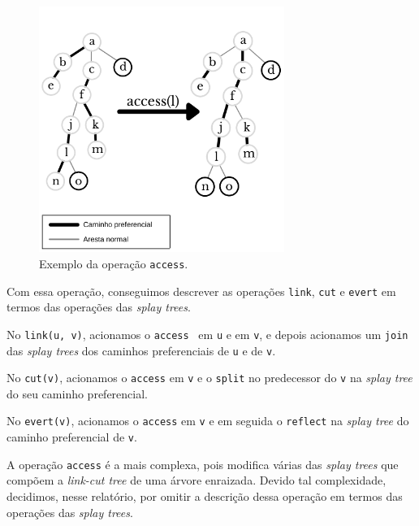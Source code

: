\begin{figure}[htb]
    \centering
    \includegraphics[width=8cm]{figura2.png}
    \caption{Exemplo da operação \texttt{access}.}
    \label{fig:access}
\end{figure}


Com essa operação, conseguimos descrever as operações \texttt{link}, \texttt{cut} e \texttt{evert} em termos das operações das \emph{splay trees}.  

No \texttt{link(u, v)}, acionamos o \texttt{access}~\cite{wiki:LinkCutTree} em \texttt{u} e em \texttt{v}, e depois acionamos um \texttt{join} das \emph{splay trees} dos caminhos preferenciais de \texttt{u} e de \texttt{v}.  

No \texttt{cut(v)}, acionamos o \texttt{access} em \texttt{v} e o \texttt{split} no predecessor do \texttt{v} na \emph{splay tree} do seu caminho preferencial.  

No \texttt{evert(v)}, acionamos o \texttt{access} em \texttt{v} e em seguida o \texttt{reflect} na \emph{splay tree} do caminho preferencial de \texttt{v}.  

A operação \texttt{access} é a mais complexa, pois modifica várias das \emph{splay trees} que compõem a \emph{link-cut tree} de uma árvore enraizada. Devido tal complexidade, decidimos, nesse relatório, por omitir a descrição dessa operação em termos das operações das \emph{splay trees}.  

